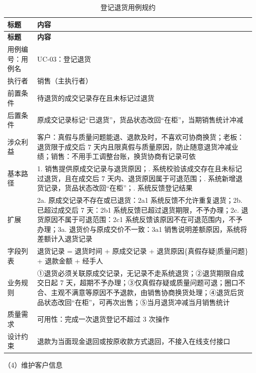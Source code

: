 \documentclass[12pt, a4paper]{ctexart}
\begin{document}
{\small
\begin{longtable}{@{}p{2.4cm} p{12.9cm}@{}}
\caption{登记退货用例规约}\label{tab:uc-03}\\
\toprule
\textbf{标题} & \textbf{内容} \\
\midrule
\endfirsthead
\toprule
\textbf{标题} & \textbf{内容} \\
\midrule
\endhead
用例编号：用例名 & UC-03：登记退货 \\
\midrule
执行者 & 销售（主执行者） \\
\midrule
前置条件 & 待退货的成交记录存在且未标记过退货 \\
\midrule
后置条件 & 原成交记录标记“已退货”，货品状态改回“在柜”，当期销售统计冲减 \\
\midrule
涉众利益 & 客户：真假与质量问题能退、退款及时，不喜欢可协商换货；\newline 老板：退货限于成交后 7 天内且限真假与质量原因，防止随意退货冲减业绩；\newline 销售：不用手工调整台账，换货协商有记录可依 \\
\midrule
基本路径 & 1. 销售提供原成交记录与退货原因；\newline 2. 系统校验该成交存在且未标记过退货，且在成交后 7 天内、退货原因属于可退范围；\newline 3. 系统新增退货记录，货品状态改回“在柜”；\newline 4. 系统反馈登记结果 \\
\midrule
扩展 & 2a. 原成交记录不存在或已退货：2a1 系统反馈不允许重复退货；\newline 2b. 已超过成交后 7 天：2b1 系统反馈已超过退货期限，不予办理；\newline 2c. 退货原因不属于可退范围：2c1 系统反馈该原因不在可退范围内，不予办理；\newline 3a. 退货价与原成交价不一致：3a1 销售说明差额原因，系统将差额计入退货记录 \\
\midrule
字段列表 & 退货记录 = 退货时间 + 原成交记录 + 退货原因\{真假存疑|质量问题\} + 退款金额 + 经手人 \\
\midrule
业务规则 & ①退货必须关联原成交记录，无记录不走系统退货；\newline ②退货期限自成交日起 7 天，超期不予办理；\newline ③仅真假存疑或质量问题可退；圈口不合、主观不满意等原因不予退款，由销售协商换货处理；\newline ④退货后货品状态改回“在柜”，可再次出售；\newline ⑤当月退货冲减当月销售统计 \\
\midrule
质量需求 & 可用性：完成一次退货登记不超过 3 次操作 \\
\midrule
设计约束 & 退款为当面现金退回或按原收款方式退回，不接入在线支付接口 \\
\midrule
\bottomrule
\end{longtable}}
\noindent（4）维护客户信息
\end{document}

